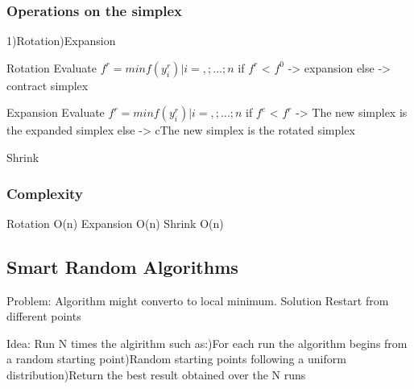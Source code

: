 \subsubsection{Operations on the simplex}
1)Rotation)Expansion\newline

Rotation\newline
Evaluate $f^r = min{f(y^r_i)|i=,;...;n}$\newline
if $f^r$ < $f^0$ -> expansion\newline
else -> contract simplex \newline

Expansion\newline
Evaluate $f^r = min{f(y^r_i)|i=,;...;n}$\newline
if $f^e$ < $f^r$ -> The new simplex is the expanded simplex\newline
else -> cThe new simplex is the rotated simplex \newline

Shrink\newline

\subsubsection{Complexity}
Rotation\newline
O(n)\newline
Expansion\newline
O(n)\newline
Shrink\newline
O(n)

\subsection{Smart Random Algorithms}
Problem:\newline
Algorithm might converto to local minimum.\newline
Solution\newline
Restart from different points\newline

Idea:\newline
Run  N times the algirithm such as:)For each run the algorithm begins from a random starting
point)Random starting points following a uniform distribution)Return the best result obtained over the N runs\newline

